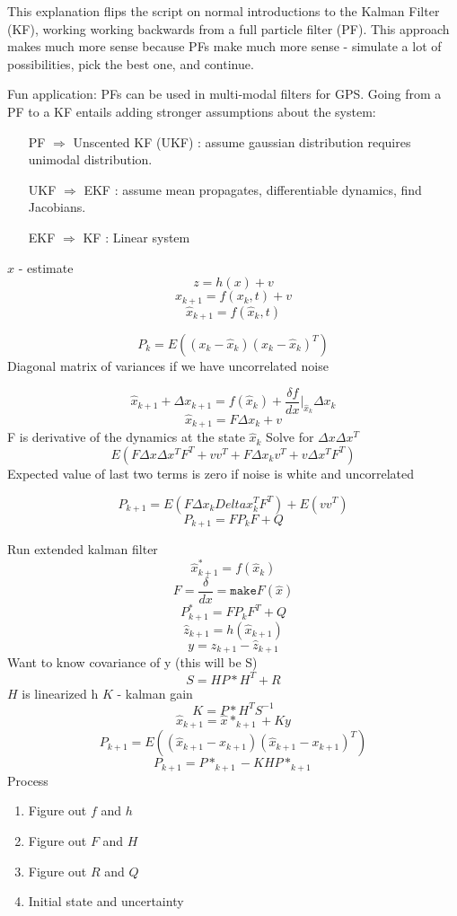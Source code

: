 \documentclass[10pt]{article}
\begin{document}
This explanation flips the script on normal introductions to the Kalman Filter (KF), working working backwards from a full particle filter (PF). This approach makes much more sense because PFs make much more sense - simulate a lot of possibilities, pick the best one, and continue.

Fun application: PFs can be used in multi-modal filters for GPS.
Going from a PF to a KF entails adding stronger assumptions about the system:
\begin{itemize}
\item[PF $\Longrightarrow$ Unscented KF (UKF)]: assume gaussian distribution requires unimodal distribution.
\item[UKF $\Longrightarrow$ EKF]: assume mean propagates, differentiable dynamics, find Jacobians.
\item[EKF $\Longrightarrow$ KF]: Linear system
\end{itemize}


$\hat{x}$ - estimate
$$z = h(x) + v$$
$$x_{k+1} = f(x_k,t) + v$$
$$\hat{x}_{k+1} = f(\hat{x}_k,t)$$

$$P_k = E((x_k-\hat{x}_k)(x_k-\hat{x}_k)^T)$$
Diagonal matrix of variances if we have uncorrelated noise

$$\hat{x}_{k+1} + \Delta x_{k+1} = f(\hat{x}_k) + \frac{\delta f}{dx} |_{\hat{x}_k} \Delta x_k $$
$$\hat{x}_{k+1} = F\Delta x_k + v$$
F is derivative of the dynamics at the state $\hat{x}_k$
Solve for $\Delta x \Delta x ^T$
$$E(F\Delta x \Delta x^T F^T + v v^T + F\Delta x_k v^T + v \Delta x^T F^T)$$
Expected value of last two terms is zero if noise is white and uncorrelated 

$$P_{k+1} = E(F \Delta x_k Delta x_k^T F^T) + E (v v^T)$$
$$P_{k+1} = FP_kF + Q$$

Run extended kalman filter
$$\hat{x}_{k+1}^* = f(\hat{x}_k)$$
$$F = \frac{\delta}{dx} = \texttt{make}F(\hat{x})$$
$$P^*_{k+1} = FP_kF^T + Q$$
$$\hat{z}_{k+1} = h(\hat{x}_{k+1})$$
$$y = z_{k+1} - \hat{z}_{k+1}$$
Want to know covariance of y (this will be S)
$$S = HP*H^T + R$$
$H$ is linearized h 
$K$ - kalman gain
$$K = P*H^TS^{-1}$$
$$\hat{x}_{k+1} = \hat{x}*_{k+1} + Ky$$
$$P_{k+1} = E((\hat{x}_{k+1}-x_{k+1})(\hat{x}_{k+1}-x_{k+1})^T)$$
$$P_{k+1} =  P*_{k+1}- KHP*_{k+1}$$
Process
\begin{enumerate}
\item Figure out $f$ and $h$
\item Figure out $F$ and $H$
\item Figure out $R$ and $Q$
\item Initial state and uncertainty
\end{enumerate}
\end{document}
